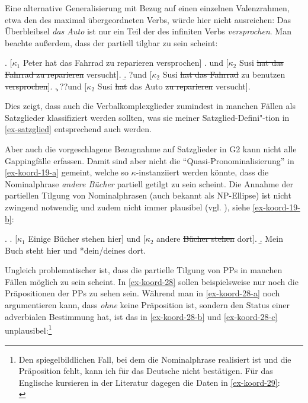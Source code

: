Eine alternative Generalisierung mit Bezug auf einen einzelnen Valenzrahmen, etwa den des maximal übergeordneten Verbs, würde hier nicht ausreichen: Das Überbleibsel {\it das Auto} ist nur ein Teil der  des infiniten Verbs {\it versprochen}. Man beachte au\ss erdem, dass der  partiell tilgbar zu sein scheint:

\ex. [$\kappa_1$ Peter hat das Fahrrad zu reparieren versprochen]\label{ex-koord-verbalkomplex}
\a. und [$\kappa_2$ Susi \sout{hat das Fahrrad zu reparieren} versucht].
\b. ?und [$\kappa_2$ Susi \sout{hat das Fahrrad} zu benutzen \sout{versprochen}].
\c. ??und [$\kappa_2$  Susi \sout{hat} das Auto \sout{zu reparieren} versucht].

Dies zeigt, dass auch die Verbalkomplexglieder zumindest in manchen Fällen als Satzglieder klassifiziert werden sollten, was sie meiner Satzglied-Defini"-tion in \ref{ex-satzglied} entsprechend auch werden.  

Aber auch die vorgeschlagene Bezugnahme auf Satzglieder in G2 kann nicht alle Gappingfälle erfassen. Damit sind aber nicht die "`Quasi-Pronominalisierung"' \citep{Kunze:72} in \ref{ex-koord-19-a} gemeint, welche so $\kappa$-instanziiert werden könnte, dass die Nominalphrase {\it andere Bücher} partiell getilgt zu sein scheint. Die Annahme der partiellen Tilgung von Nominalphrasen (auch bekannt als NP-Ellipse) ist nicht zwingend notwendig und zudem nicht immer plausibel (vgl. \citealt[781f]{Klein:93}), siehe \ref{ex-koord-19-b}:

\ex. \label{ex-koord-19}
\a. \label{ex-koord-19-a}[$\kappa_1$ Einige Bücher stehen hier] und [$\kappa_2$ andere \sout{Bücher stehen} dort]. \hfill \citep[(3-160)]{Hesse:Kuestner:85}
\b. \label{ex-koord-19-b}Mein Buch steht hier und *dein/deines dort. \hfill \citep[(3-161)]{Hesse:Kuestner:85}

Ungleich problematischer ist, dass die partielle Tilgung von PPs in manchen Fällen möglich zu sein scheint. In \ref{ex-koord-28} sollen beispielsweise nur noch die Präpositionen der PPs zu sehen sein. Während man in \ref{ex-koord-28-a} noch argumentieren kann, dass {\it ohne} keine Präposition ist, sondern den Status einer adverbialen Bestimmung hat, ist das in \ref{ex-koord-28-b} und \ref{ex-koord-28-c} unplausibel:\footnote{Den spiegelbildlichen Fall, bei dem die Nominalphrase realisiert ist und die Präposition fehlt, kann ich für das Deutsche nicht bestätigen. Für das Englische kursieren in der Literatur dagegen die Daten in \ref{ex-koord-29}:\\
}

